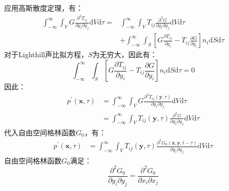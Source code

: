 \begin{enumerate}
\begin{equation}
    \end{equation}
    应用高斯散度定理，有：
    \begin{equation}
        \begin{aligned}
            \int_{-\infty}^{\infty} \int_{V} G \frac{\partial^{2} T_{i j}}{\partial y_{i} \partial y_{j}} \mathrm{d} V \mathrm{d} \tau =
            & \int_{-\infty}^{\infty} \int_{V} T_{i j} \frac{\partial^{2} G}{\partial y_{i} \partial y_{j}} \mathrm{d} V \mathrm{d} \tau \\
            & + \int_{-\infty}^{\infty} \int_{S} \left[G \frac{\partial T_{i j}}{\partial y_{i}}
              - T_{i j} \frac{\partial G}{\partial y_{i}}\right] n_{i} \mathrm{d} S \mathrm{d} \tau
        \end{aligned}
    \end{equation}
    对于Lighthill声比拟方程，$S$为无穷大，因此有：
    \begin{equation}
        \int_{-\infty}^{\infty} \int_{S} \left[G \frac{\partial T_{i j}}{\partial y_{i}}
        - T_{i j} \frac{\partial G}{\partial y_{i}}\right] n_{i} \mathrm{d} S \mathrm{d} \tau
        = 0
    \end{equation}
    因此：
    \begin{equation}
        \begin{aligned}
            p^{\prime}(\mathbf{x},\tau) 
            &= \int_{-\infty}^{\infty} \int_{V} G \frac{\partial^{2} T_{i j}(\mathbf{y},\tau)}{\partial y_{i} \partial y_{j}} \mathrm{d} V \mathrm{d} \tau \\
            &= \int_{-\infty}^{\infty} \int_{V} T_{i j}(\mathbf{y},\tau) \frac{\partial^{2} G}{\partial y_{i} \partial y_{j}} \mathrm{d} V \mathrm{d} \tau 
        \end{aligned}
    \end{equation}
    代入自由空间格林函数$G_{0}$，有：
    \begin{equation}
        \begin{aligned}
            p^{\prime}(\mathbf{x},\tau) 
            &= \int_{-\infty}^{\infty} \int_{V} T_{i j}(\mathbf{y},\tau) \frac{\partial^{2} G_{0}(\mathbf{x},\mathbf{y},t-\tau)}{\partial y_{i} \partial y_{j}} \mathrm{d} V \mathrm{d} \tau 
        \end{aligned}
    \end{equation}
    自由空间格林函数$G_{0}$满足：
    \begin{equation}
        \frac{\partial^{2} G_{0}}{\partial y_{i} \partial y_{j}} 
        = \frac{\partial^{2} G_{0}}{\partial x_{i} \partial x_{j}} 

\end{equation}
\end{enumerate}
